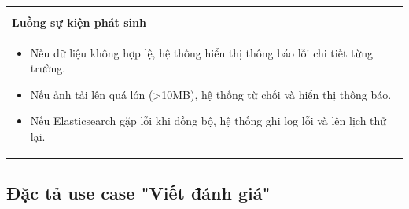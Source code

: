 \documentclass[13pt,a4paper,twoside]{report}
\begin{document}
\begin{longtable}{p{3.5cm} p{11.5cm}}
{  } \\
  \midrule
  \multicolumn{2}{p{15cm}}{\textbf{Luồng sự kiện phát sinh}} \\
  \midrule
  \multicolumn{2}{p{15cm}}{%
    \begin{itemize}[nosep]
      \item Nếu dữ liệu không hợp lệ, hệ thống hiển thị thông báo lỗi chi tiết từng trường.
      \item Nếu ảnh tải lên quá lớn (>10MB), hệ thống từ chối và hiển thị thông báo.
      \item Nếu Elasticsearch gặp lỗi khi đồng bộ, hệ thống ghi log lỗi và lên lịch thử lại.
    \end{itemize}
  } \\
  \bottomrule
\end{longtable}

\subsection{Đặc tả use case "Viết đánh giá"}
\end{document}
